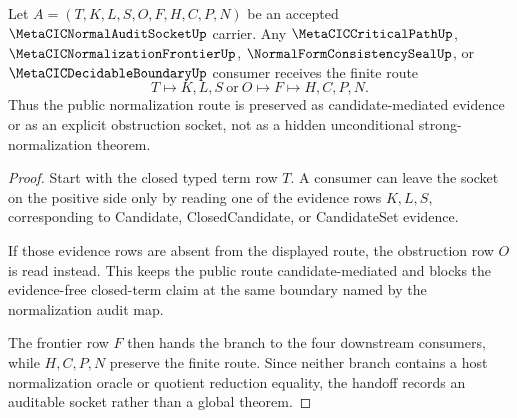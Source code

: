 \begin{theorem}
\label{thm:metacic-normal-audit-socket-frontier-handoff}
Let $A=(T,K,L,S,O,F,H,C,P,N)$ be an accepted $\MetaCICNormalAuditSocketUp$ carrier. Any $\MetaCICCriticalPathUp$, $\MetaCICNormalizationFrontierUp$, $\NormalFormConsistencySealUp$, or $\MetaCICDecidableBoundaryUp$ consumer receives the finite route
$$
T \longmapsto K,L,S \ \text{or}\ O \longmapsto F \longmapsto H,C,P,N .
$$
Thus the public normalization route is preserved as candidate-mediated evidence or as an explicit obstruction socket, not as a hidden unconditional strong-normalization theorem.
\end{theorem}
\begin{proof}
Start with the closed typed term row $T$. A consumer can leave the socket on the positive side only by reading one of the evidence rows $K,L,S$, corresponding to Candidate, ClosedCandidate, or CandidateSet evidence.

If those evidence rows are absent from the displayed route, the obstruction row $O$ is read instead. This keeps the public route candidate-mediated and blocks the evidence-free closed-term claim at the same boundary named by the normalization audit map.

The frontier row $F$ then hands the branch to the four downstream consumers, while $H,C,P,N$ preserve the finite route. Since neither branch contains a host normalization oracle or quotient reduction equality, the handoff records an auditable socket rather than a global theorem.
\end{proof}

